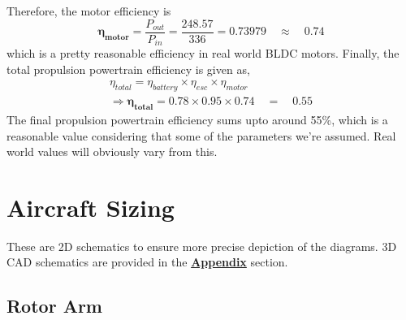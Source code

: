 \documentclass[12pt]{report}
\begin{document}
  Therefore, the motor efficiency is \[ \boldsymbol{\eta_{motor}} = \frac{P_{out}}{P_{in}} = \frac{248.57}{336} = 0.73979 \quad \approx \quad \boldsymbol{0.74} \] which is a pretty reasonable efficiency in real world BLDC motors. Finally, the total propulsion powertrain efficiency is given as, 
  \begin{gather*}
    \eta_{total} = \eta_{battery} \times \eta_{esc} \times \eta_{motor} \\
    \Rightarrow \boldsymbol{\eta_{total}} = 0.78 \times 0.95 \times 0.74 \quad = \quad \boldsymbol{0.55}
  \end{gather*}
  The final propulsion powertrain efficiency sums upto around 55\%, which is a reasonable value considering that some of the parameters we're assumed. Real world values will obviously vary from this.
      
     
    \section{Aircraft Sizing}
    These are 2D schematics to ensure more precise depiction of the diagrams. 3D CAD schematics are provided in the \hyperref[chap:appendix]{\textbf{Appendix}} section.

      \subsection*{Rotor Arm}
\end{document}
